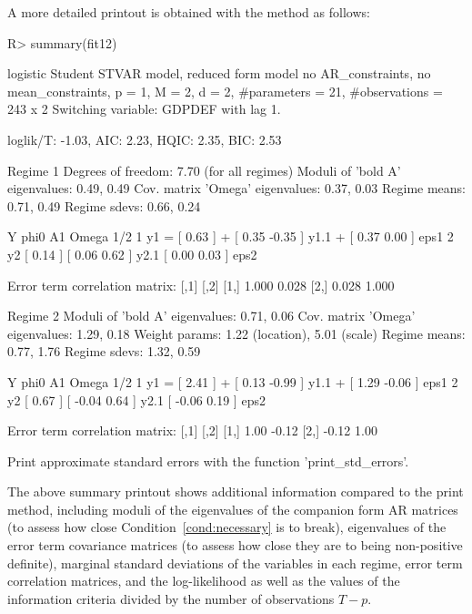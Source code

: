 \documentclass[nojss]{jss}
\begin{document}
A more detailed printout is obtained with the  method as follows:
%
\begin{CodeChunk}
\begin{CodeInput}
R> summary(fit12)
\end{CodeInput}
\begin{CodeOutput}
logistic Student STVAR model, reduced form model no AR_constraints, no mean_constraints,
  p = 1, M = 2, d = 2, #parameters = 21, #observations = 243 x 2
  Switching variable: GDPDEF with lag 1.

loglik/T: -1.03, AIC: 2.23, HQIC: 2.35, BIC: 2.53

Regime 1
Degrees of freedom: 7.70 (for all regimes)
Moduli of 'bold A' eigenvalues:  0.49, 0.49
Cov. matrix 'Omega' eigenvalues: 0.37, 0.03
Regime means: 0.71, 0.49
Regime sdevs: 0.66, 0.24

   Y     phi0          A1                  Omega        1/2
1 y1 = [ 0.63 ] + [  0.35 -0.35 ] y1.1 + [  0.37 0.00 ]     eps1
2 y2   [ 0.14 ]   [  0.06  0.62 ] y2.1   [  0.00 0.03 ]     eps2

Error term correlation matrix:
      [,1]  [,2]
[1,] 1.000 0.028
[2,] 0.028 1.000

Regime 2
Moduli of 'bold A' eigenvalues:  0.71, 0.06
Cov. matrix 'Omega' eigenvalues: 1.29, 0.18
Weight params: 1.22 (location), 5.01 (scale)
Regime means: 0.77, 1.76
Regime sdevs: 1.32, 0.59

   Y     phi0          A1                  Omega         1/2
1 y1 = [ 2.41 ] + [  0.13 -0.99 ] y1.1 + [  1.29 -0.06 ]     eps1
2 y2   [ 0.67 ]   [ -0.04  0.64 ] y2.1   [ -0.06  0.19 ]     eps2

Error term correlation matrix:
      [,1]  [,2]
[1,]  1.00 -0.12
[2,] -0.12  1.00

Print approximate standard errors with the function 'print_std_errors'.
\end{CodeOutput}
\end{CodeChunk}
%
The above summary printout shows additional information compared to the print method, including moduli of the eigenvalues of the companion form AR matrices (to assess how close Condition~\ref{cond:necessary} is to break), eigenvalues of the error term covariance matrices (to assess how close they are to being non-positive definite), marginal standard deviations of the variables in each regime, error term correlation matrices, and the log-likelihood as well as the values of the information criteria divided by the number of observations $T-p$.
\end{document}
